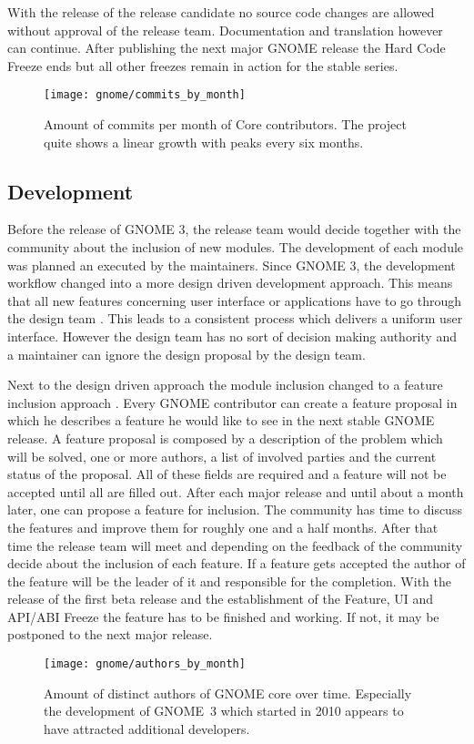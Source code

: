 With the release of the release candidate no source code changes are allowed
without approval of the release team. Documentation and translation however can
continue. After publishing the next major GNOME release the Hard Code Freeze
ends but all other freezes remain in action for the stable series.

\begin{figure}[htbp]
  \centering
  \texttt{[image: gnome/commits\_by\_month]}
  \caption{Amount of commits per month of Core contributors. The project quite shows
  a linear growth with peaks every six months.}
\end{figure}


\subsection{Development} %

Before the release of GNOME 3, the release team would decide together with the
community about the inclusion of new modules. The development of each module
was planned an executed by the maintainers. Since GNOME 3, the development
workflow changed into a more design driven development approach. This means
that all new features concerning user interface or applications have to go
through the design team \cite{GNOMEDesignTeam}. This leads to a consistent
process which delivers a uniform user interface. However the design team has no
sort of decision making authority and a maintainer can ignore the design
proposal by the design team.

Next to the design driven approach the module inclusion changed to a feature
inclusion approach \cite{GNOMEFeatures3.4,GNOMERoadMap}. Every GNOME
contributor can create a feature proposal in which he describes a feature he
would like to see in the next stable GNOME release. A feature proposal is
composed by a description of the problem which will be solved, one or more
authors, a list of involved parties and the current status of the proposal. All
of these fields are required and a feature will not be accepted until all are
filled out. After each major release and until about a month later, one can
propose a feature for inclusion. The community has time to discuss the features
and improve them for roughly one and a half months. After that time the release
team will meet and depending on the feedback of the community decide about the
inclusion of each feature. If a feature gets accepted the author of the feature
will be the leader of it and responsible for the completion. With the release
of the first beta release and the establishment of the Feature, UI and
\ac{API}/\ac{ABI} Freeze the feature has to be finished and working. If not, it
may be postponed to the next major release.

\begin{figure}[htbp]
  \centering
  \texttt{[image: gnome/authors\_by\_month]}
  \caption{Amount of distinct authors of GNOME core over time. Especially the
  development of GNOME~3 which started in 2010 appears to have attracted
  additional developers.}
\end{figure}


